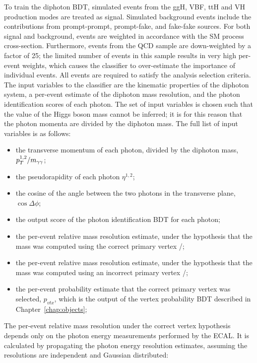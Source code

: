To train the diphoton BDT, simulated events from the ggH, VBF, ttH 
and VH production modes are treated as signal. 
Simulated background events include the contributions from prompt-prompt, prompt-fake, 
and fake-fake sources.
For both signal and background, 
events are weighted in accordance with the SM process cross-section.
Furthermore, events from the QCD sample are down-weighted by a factor of 25;
the limited number of events in this sample results in very high per-event weights, 
which causes the classifier to over-estimate the importance of individual events.
All events are required to satisfy the analysis selection criteria.
The input variables to the classifier are the kinematic properties of the diphoton system, 
a per-event estimate of the diphoton mass resolution, 
and the photon identification scores of each photon.
The set of input variables is chosen such that the value of the Higgs boson mass cannot be inferred;
it is for this reason that the photon momenta are divided by the diphoton mass.
The full list of input variables is as follows:
\begin{itemize}
\item the transverse momentum of each photon, divided by the diphoton mass, $p_T^{1,2}/m_{\gamma\gamma}$;
\item the pseudorapidity of each photon $\eta^{1,2}$;
\item the cosine of the angle between the two photons in the transverse plane, $\cos{\Delta\phi}$;
\item the output score of the photon identification BDT for each photon;
\item the per-event relative mass resolution estimate, 
      under the hypothesis that the mass was computed using the correct primary vertex \srv/\mgg;
\item the per-event relative mass resolution estimate, 
      under the hypothesis that the mass was computed using an incorrect primary vertex \swv/\mgg;
\item the per-event probability estimate that the correct primary vertex was selected, $p_{vtx}$,
      which is the output of the vertex probability BDT described in Chapter~\ref{chap:objects};
\end{itemize}

The per-event relative mass resolution under the correct vertex hypothesis 
depends only on the photon energy measurements performed by the ECAL.
It is calculated by propagating the photon energy resolution estimates, 
assuming the resolutions are independent and Gaussian distributed:

